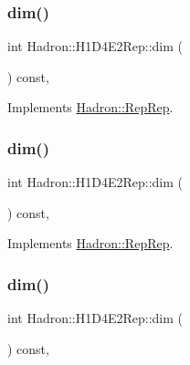\subsubsection{\texorpdfstring{dim()}{dim()}\hspace{0.1cm}{\footnotesize\ttfamily [3/5]}}
{\footnotesize\ttfamily int Hadron\+::\+H1\+D4\+E2\+Rep\+::dim (\begin{DoxyParamCaption}{ }\end{DoxyParamCaption}) const\hspace{0.3cm}{\ttfamily [inline]}, {\ttfamily [virtual]}}



Implements \mbox{\hyperlink{structHadron_1_1RepRep_a92c8802e5ed7afd7da43ccfd5b7cd92b}{Hadron\+::\+Rep\+Rep}}.

\mbox{\label{structHadron_1_1H1D4E2Rep_a01e217ac021a9f606e9cc27e4c62389e}} 
\subsubsection{\texorpdfstring{dim()}{dim()}\hspace{0.1cm}{\footnotesize\ttfamily [4/5]}}
{\footnotesize\ttfamily int Hadron\+::\+H1\+D4\+E2\+Rep\+::dim (\begin{DoxyParamCaption}{ }\end{DoxyParamCaption}) const\hspace{0.3cm}{\ttfamily [inline]}, {\ttfamily [virtual]}}



Implements \mbox{\hyperlink{structHadron_1_1RepRep_a92c8802e5ed7afd7da43ccfd5b7cd92b}{Hadron\+::\+Rep\+Rep}}.

\mbox{\label{structHadron_1_1H1D4E2Rep_a01e217ac021a9f606e9cc27e4c62389e}} 
\subsubsection{\texorpdfstring{dim()}{dim()}\hspace{0.1cm}{\footnotesize\ttfamily [5/5]}}
{\footnotesize\ttfamily int Hadron\+::\+H1\+D4\+E2\+Rep\+::dim (\begin{DoxyParamCaption}{ }\end{DoxyParamCaption}) const\hspace{0.3cm}{\ttfamily [inline]}, {\ttfamily [virtual]}}



